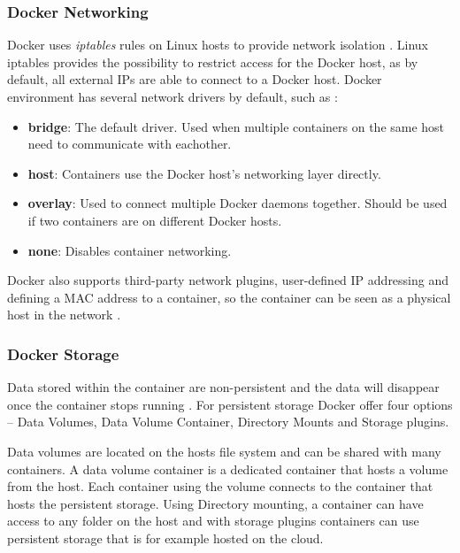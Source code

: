 \documentclass[fleqn,12pt]{olplainarticle}
\begin{document}
\subsubsection{Docker Networking}

Docker uses \textit{iptables} rules on Linux hosts to provide network isolation \citep{docker:iptables}. Linux iptables provides the possibility to restrict access for the Docker host, as by default, all external IPs are able to connect to a Docker host. Docker environment has several network drivers by default, such as \citep{docker:network}:

\begin{itemize}
    \item \textbf{bridge}: The default driver. Used when multiple containers on the same host need to communicate with eachother.
    \item \textbf{host}: Containers use the Docker host's networking layer directly.
    \item \textbf{overlay}: Used to connect multiple Docker daemons together. Should be used if two containers are on different Docker hosts.
    \item \textbf{none}: Disables container networking.  
\end{itemize}

Docker also supports third-party network plugins, user-defined IP addressing and defining a MAC address to a container, so the container can be seen as a physical host in the network \citep{docker:network}.

\subsubsection{Docker Storage}

Data stored within the container are non-persistent and the data will disappear once the container stops running \citep{aquasec:docker_architecture}. For persistent storage Docker offer four options – Data Volumes, Data Volume Container, Directory Mounts and Storage plugins. 

Data volumes are located on the hosts file system and can be shared with many containers. A data volume container is a dedicated container that hosts a volume from the host. Each container using the volume connects to the container that hosts the persistent storage. Using Directory mounting, a container can have access to any folder on the host and with storage plugins containers can use persistent storage that is for example hosted on the cloud.
\end{document}
